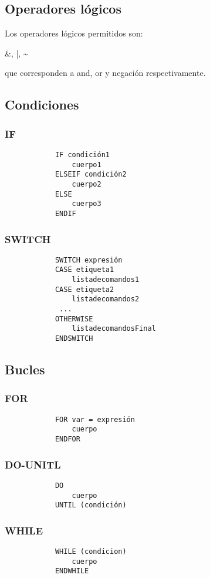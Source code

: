 \documentclass[a4,12pt,graphicx,caption,rotating]{article}
\begin{document}
\subsection{Operadores lógicos}
Los operadores lógicos permitidos son:
\begin{center}
\&, |, \~~
\end{center} 
que corresponden a and, or y negación respectivamente.
\subsection{Condiciones}
\subsubsection{IF}
\begin{verbatim}
            IF condición1
                cuerpo1
            ELSEIF condición2
                cuerpo2
            ELSE
                cuerpo3
            ENDIF
\end{verbatim} 
\subsubsection{SWITCH}
\begin{verbatim}
            SWITCH expresión
            CASE etiqueta1
                listadecomandos1
            CASE etiqueta2
                listadecomandos2
             ... 
            OTHERWISE
                listadecomandosFinal
            ENDSWITCH 
\end{verbatim}
\subsection{Bucles}
\subsubsection{FOR}
\begin{verbatim}
            FOR var = expresión
                cuerpo
            ENDFOR
\end{verbatim}
\subsubsection{DO-UNITL}
\begin{verbatim}
            DO
                cuerpo
            UNTIL (condición)
\end{verbatim}
\subsubsection{WHILE}
\begin{verbatim}
            WHILE (condicion)
                cuerpo
            ENDWHILE
\end{verbatim}
\end{document}
